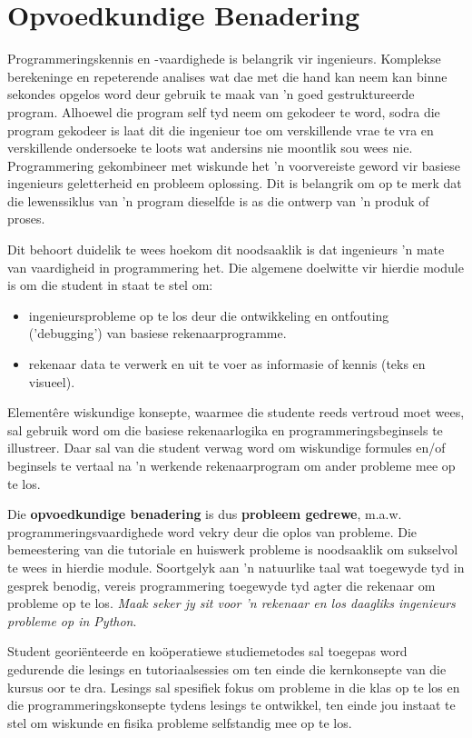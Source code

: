\section{Opvoedkundige Benadering}
Programmeringskennis en -vaardighede is belangrik vir
ingenieurs. Komplekse berekeninge en repeterende analises wat dae met
die hand kan neem kan binne sekondes opgelos word deur gebruik te maak
van 'n goed gestruktureerde program. Alhoewel die program self tyd
neem om gekodeer te word, sodra die program gekodeer is laat dit die
ingenieur toe om verskillende vrae te vra en verskillende ondersoeke
te loots wat andersins nie moontlik sou wees nie. Programmering
gekombineer met wiskunde het 'n voorvereiste geword vir basiese
ingenieurs geletterheid en probleem oplossing. Dit is belangrik om op
te merk dat die lewenssiklus van 'n program dieselfde is as die
ontwerp van 'n produk of proses.

Dit behoort duidelik te wees hoekom dit noodsaaklik is dat ingenieurs
'n mate van vaardigheid in programmering het. Die algemene doelwitte
vir hierdie module is om die student in staat te stel om:
    \begin{itemize}
    \item ingenieursprobleme op te los deur die ontwikkeling en ontfouting
      ('debugging') van basiese rekenaarprogramme.
    \item rekenaar data te verwerk en uit te voer as informasie of
      kennis (teks en visueel).
    \end{itemize}

    Element\^{e}re wiskundige konsepte, waarmee die studente reeds vertroud 
    moet wees, sal gebruik word om die basiese rekenaarlogika en 
    programmeringsbeginsels 
    te illustreer. Daar sal van die student verwag word om 
    wiskundige formules en/of beginsels te vertaal na 'n werkende 
    rekenaarprogram
    om ander probleme mee op te los.

    Die \textbf{opvoedkundige benadering} is dus \textbf{probleem
      gedrewe}, m.a.w.  programmeringsvaardighede word vekry deur die
    oplos van probleme. Die bemeestering van die tutoriale en huiswerk
    probleme is noodsaaklik om sukselvol te wees in hierdie
    module. Soortgelyk aan 'n natuurlike taal wat toegewyde tyd in
    gesprek benodig, vereis programmering toegewyde tyd agter die
    rekenaar om probleme op te los. \textit{Maak seker jy sit voor 'n
      rekenaar en los daagliks ingenieurs probleme op in Python}.
    
    Student geori\"{e}nteerde en ko\"{o}peratiewe studiemetodes sal
    toegepas word gedurende die lesings en tutoriaalsessies om ten
    einde die kernkonsepte van die kursus oor te dra.  Lesings sal
    spesifiek fokus om probleme in die klas op te los en die
    programmeringskonsepte tydens lesings te ontwikkel, ten einde jou
    instaat te stel om wiskunde en fisika probleme selfstandig mee op
    te los.

